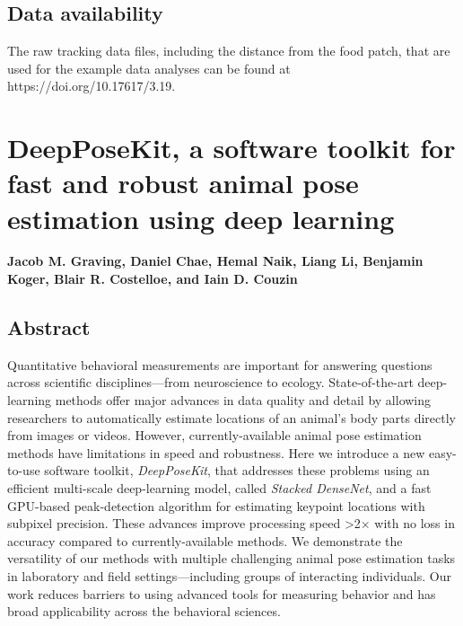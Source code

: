 \documentclass[11pt,a4paper,oneside]{book}
\begin{document}
\section{Data availability}
The raw tracking data files, including the distance from the food patch, that are used for the example data analyses can be found at https://doi.org/10.17617/3.19.




\newpage 
	\chapter[DeepPoseKit, animal pose estimation]{DeepPoseKit, a software toolkit for fast and robust animal pose estimation using deep learning}
	\vspace{5mm}
	\textbf{Jacob M. Graving, Daniel Chae, Hemal Naik, Liang Li, Benjamin Koger, Blair R. Costelloe, and Iain D. Couzin} \\

	\section{Abstract}

    Quantitative behavioral measurements are important for answering questions across scientific disciplines---from neuroscience to ecology. State-of-the-art deep-learning methods offer major advances in data quality and detail by allowing researchers to automatically estimate locations of an animal's body parts directly from images or videos. However, currently-available animal pose estimation methods have limitations in speed and robustness. Here we introduce a new easy-to-use software toolkit, \textit{DeepPoseKit}, that addresses these problems using an efficient multi-scale deep-learning model, called \textit{Stacked DenseNet}, and a fast GPU-based peak-detection algorithm for estimating keypoint locations with subpixel precision. These advances improve processing speed >2$\times$ with no loss in accuracy compared to currently-available methods. We demonstrate the versatility of our methods with multiple challenging animal pose estimation tasks in laboratory and field settings---including groups of interacting individuals. Our work reduces barriers to using advanced tools for measuring behavior and has broad applicability across the behavioral sciences.
\end{document}
